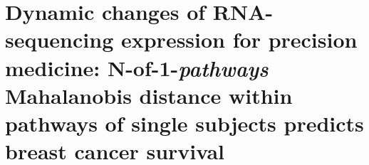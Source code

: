 \chapter{Dynamic changes of RNA-sequencing expression for precision medicine: N-of-1-\emph{pathways} Mahalanobis distance within pathways of single subjects predicts breast cancer survival} \label{App:A}
